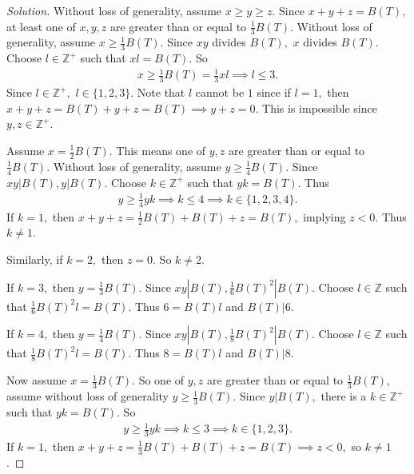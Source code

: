 \documentclass[12pt]{article}
\newcommand{\Z}{\mathbb{Z}}
\newenvironment{exercise}[2][Exercise]{\begin{trivlist}
        \item[\hskip \labelsep {\bfseries #1}\hskip \labelsep {\bfseries #2.}]}{\end{trivlist}}
\newenvironment{solution}
        {\begin{proof}[Solution]}
                    {\end{proof}}
\begin{document}
\begin{exercise}{78}
\begin{solution}
        Without loss of generality, assume \( x \geq y \geq z. \) Since \( x + y + z = B(T) , \) at least one of \( x,y,z \) are greater than or equal to \( \frac{1}{3} B(T) . \) Without loss of generality, assume \( x \geq \frac{1}{3} B(T) . \) Since \( xy  \) divides \( B(T) , \) \( x \) divides \( B(T) . \) Choose \( l \in \Z^{+}  \) such that \( x l = B(T) . \) So \begin{align*}
            x \geq \frac{1}{3}B(T) = \frac{1}{3} x l \implies l \leq 3 .
        \end{align*}
        Since \( l \in \Z^{+} , \) \( l \in \{1,2,3\} \). Note that \( l \) cannot be \( 1 \) since if \( l = 1 ,\) then \( x + y + z = B(T) + y + z = B(T) \implies y+z = 0.\) This is impossible since \( y,z \in \Z^{+} . \)

        Assume \( x = \frac{1}{2} B(T) . \) This means one of \( y,z \) are greater than or equal to \( \frac{1}{4} B(T) . \) Without loss of generality, assume \( y \geq \frac{1}{4} B(T) . \) Since \( xy | B(T) , y | B(T) . \) Choose \( k \in \Z^{+} \) such that \( yk = B(T) . \) Thus \begin{align*}
            y \geq \frac{1}{4} yk \implies k \leq 4 \implies k \in \{1,2,3,4\} .
        \end{align*}
        If \( k = 1 , \) then \( x + y + z = \frac{1}{2} B(T) + B(T) + z = B(T) , \) implying \( z < 0. \) Thus \( k \neq 1. \)

        Similarly, if \( k = 2 , \) then \( z = 0. \) So \( k \neq 2 . \)

        If \( k = 3, \) then \( y = \frac{1}{3} B(T) . \) Since \( xy | B(T) , \frac{1}{6} B(T)^{2} | B(T) .\) Choose \( l \in \Z \) such that \( \frac{1}{6} B(T)^{2} l = B(T) . \) Thus \( 6 = B(T) l\) and \( B(T) | 6. \)

        If \( k = 4, \) then \( y = \frac{1}{4} B(T) . \) Since \( xy | B(T) , \frac{1}{8} B(T)^{2} | B(T) .\) Choose \( l \in \Z \) such that \( \frac{1}{8} B(T)^{2} l = B(T) . \) Thus \( 8 = B(T) l\) and \( B(T) | 8. \)

        Now assume \( x = \frac{1}{3} B(T) . \) So one of \( y, z \) are greater than or equal to \( \frac{1}{3} B(T) , \) assume without loss of generality \( y \geq \frac{1}{3} B(T) . \) Since \( y | B(T) , \) there is a \( k \in \Z^{+} \) such that \( yk = B(T) . \) So
        \begin{align*}
            y \geq \frac{1}{3} yk \implies k \leq 3 \implies k \in \{1,2,3\} .
        \end{align*}
        If \( k = 1, \) then \( x + y+ z = \frac{1}{3} B(T) + B(T) + z = B(T) \implies z < 0, \) so \( k \neq 1 \).


\end{solution}
\end{exercise}
\end{document}
